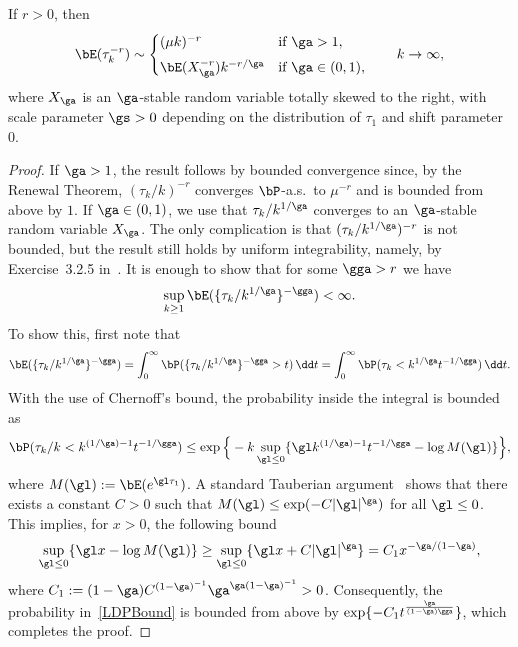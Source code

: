 \begin{lemm}\label{lem:conv.power.tauk}
If $r > 0$, then
\begin{equation}
\bE(\tau_k^{- r}) \sim
\begin{cases}
(\mu k)^{- r} & \text{if } \ga > 1,\\[4pt]
\bE(X_\ga^{- r}) k^{- r/\ga} & \text{if } \ga \in (0,1),
\end{cases}
\qquad k \to \infty,
\end{equation}
where $X_\ga$ is an $\ga$-stable random variable totally skewed to the right, with scale parameter $\gs > 0$ depending on the distribution of $\tau_1$ and shift parameter $0$.
\end{lemm}

\begin{proof}
If $\ga > 1$, the result follows by bounded convergence since, by the Renewal Theorem, $(\tau_k/k)^{- r}$ converges $\bP$-a.s.~to $\mu^{- r}$ and is bounded from above by $1$. If $\ga \in (0,1)$, we use that $\tau_k/k^{1/\ga}$ converges to an $\ga$-stable random variable $X_\ga$. The only complication is that $(\tau_k/k^{1/\ga})^{- r}$ is not bounded, but the result still holds by uniform integrability, namely, by Exercise~3.2.5 in~\cite{Du10}. It is enough to show that for some $\gga > r$ we have
\begin{equation}\label{eq:UItau}
\sup_{k\geq1} \bE(\{\tau_k/k^{1/\ga}\}^{- \gga}) < \infty.
\end{equation}
To show this, first note that
\begin{equation}\label{ExpectationTail}
\bE(\{\tau_k/k^{1/\ga}\}^{- \gga}) = \int_0^\infty \bP(\{\tau_k/k^{1/\ga}\}^{- \gga} > t) \, \dd t = \int_0^\infty \bP(\tau_k < k^{1/\ga} t^{- 1/\gga}) \, \dd t.
\end{equation}
With the use of Chernoff's bound, the probability inside the integral is bounded as
\begin{equation}\label{LDPBound}
\bP(\tau_k/k < k^{(1/\ga) - 1} t^{- 1/\gga}) \leq \exp \Big\{ - k \sup_{\gl\leq0} \{\gl k^{(1/\ga) - 1} t^{- 1/\gga} - \log M(\gl)\} \Big\},
\end{equation}
where $M(\gl) := \bE(e^{\gl \tau_1})$. A standard Tauberian argument~\cite[(5.22) of Chapter~XIII]{Feller71} shows that there exists a constant $C > 0$ such that $M(\gl) \leq \exp({- C |\gl|^\ga})$ for all $\gl \leq 0$. This implies, for $x > 0$, the following bound
\begin{equation}
\sup_{\gl\leq0} \{\gl x - \log M(\gl)\} \geq \sup_{\gl\leq0} \{\gl x + C |\gl|^\ga\} = C_1 x^{- \ga/(1 - \ga)},
\end{equation}
where $C_1 := (1 - \ga) C^{(1 - \ga)^{-1}} \ga^{\ga (1 - \ga)^{-1}} > 0$. Consequently, the probability in~\eqref{LDPBound} is bounded from above by $\exp\{- C_1 t^\frac{\ga}{(1 - \ga) \gga}\}$, which completes the proof.
\end{proof}

